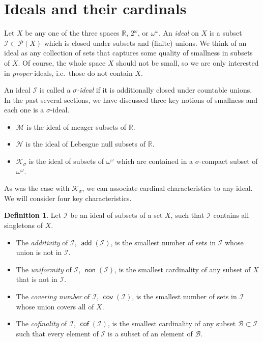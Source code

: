 \documentclass[11pt,oneside]{amsart}
\newcommand{\RR}{\mathbb R}
\DeclareMathOperator{\add}{\mathsf{add}}
\DeclareMathOperator{\non}{\mathsf{non}}
\DeclareMathOperator{\cov}{\mathsf{cov}}
\DeclareMathOperator{\cof}{\mathsf{cof}}
\theoremstyle{definition}
\theoremstyle{definition}
\newtheorem{defn}[thm]{Definition}
\theoremstyle{remark}
\begin{document}

\section{Ideals and their cardinals}

Let $X$ be any one of the three spaces $\RR$, $2^\omega$, or $\omega^\omega$. An \emph{ideal} on $X$ is a subset $\mathcal I\subset\mathcal P(X)$ which is closed under subsets and (finite) unions. We think of an ideal as any collection of sets that captures some quality of smallness in subsets of $X$. Of course, the whole space $X$ should not be small, so we are only interested in \emph{proper} ideals, i.e.\ those do not contain $X$.

An ideal $\mathcal I$ is called a \emph{$\sigma$-ideal} if it is additionally closed under countable unions. In the past several sections, we have discussed three key notions of smallness and each one is a $\sigma$-ideal.
\begin{itemize}
\item $\mathcal M$ is the ideal of meager subsets of $\RR$.
\item $\mathcal N$ is the ideal of Lebesgue null subsets of $\RR$.
\item $\mathcal K_\sigma$ is the ideal of subsets of $\omega^\omega$ which are contained in a $\sigma$-compact subset of $\omega^\omega$.
\end{itemize}

As was the case with $\mathcal K_\sigma$, we can associate cardinal characteristics to any ideal. We will consider four key characteristics.

\begin{defn} Let $\mathcal{I}$ be an ideal of subsets of a set $X$, such that $\mathcal I$ contains all singletons of $X$. 
  \begin{itemize}
  \item The \emph{additivity} of $\mathcal{I}$, $\add(\mathcal{I})$, is the smallest number of sets in $\mathcal{I}$ whose union is not in $\mathcal{I}$.
  \item The \emph{uniformity} of $\mathcal{I}$, $\non(\mathcal{I})$, is the smallest cardinality of any subset of $X$ that is not in $\mathcal{I}$.
  \item The \emph{covering number} of $\mathcal{I}$, $\cov(\mathcal{I})$, is the smallest number of sets in $\mathcal{I}$ whose union covers all of $X$.
  \item The \emph{cofinality} of $\mathcal{I}$, $\cof(\mathcal{I})$, is the smallest cardinality of any subset $\mathcal{B}\subset\mathcal{I}$ such that every element of $\mathcal{I}$ is a subset of an element of $\mathcal{B}$.
  \end{itemize}
\end{defn}
\end{document}

